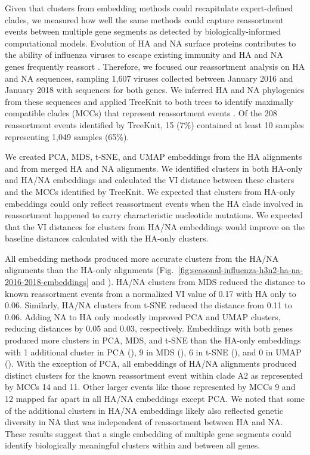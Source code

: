 \documentclass[10pt,letterpaper]{article}
\begin{document}
Given that clusters from embedding methods could recapitulate expert-defined clades, we measured how well the same methods could capture reassortment events between multiple gene segments as detected by biologically-informed computational models.
Evolution of HA and NA surface proteins contributes to the ability of influenza viruses to escape existing immunity \cite{Petrova2018} and HA and NA genes frequently reassort \cite{Nelson2008,Marshall2013,Potter2019}.
Therefore, we focused our reassortment analysis on HA and NA sequences, sampling 1,607 viruses collected between January 2016 and January 2018 with sequences for both genes.
We inferred HA and NA phylogenies from these sequences and applied TreeKnit to both trees to identify maximally compatible clades (MCCs) that represent reassortment events \cite{Barrat-Charlaix2022}.
Of the 208 reassortment events identified by TreeKnit, 15 (7\%) contained at least 10 samples representing 1,049 samples (65\%).

We created PCA, MDS, t-SNE, and UMAP embeddings from the HA alignments and from merged HA and NA alignments.
We identified clusters in both HA-only and HA/NA embeddings and calculated the VI distance between these clusters and the MCCs identified by TreeKnit.
We expected that clusters from HA-only embeddings could only reflect reassortment events when the HA clade involved in reassortment happened to carry characteristic nucleotide mutations.
We expected that the VI distances for clusters from HA/NA embeddings would improve on the baseline distances calculated with the HA-only clusters.

All embedding methods produced more accurate clusters from the HA/NA alignments than the HA-only alignments (Fig.~\ref{fig:seasonal-influenza-h3n2-ha-na-2016-2018-embeddings} and ).
HA/NA clusters from MDS reduced the distance to known reassortment events from a normalized VI value of 0.17 with HA only to 0.06.
Similarly, HA/NA clusters from t-SNE reduced the distance from 0.11 to 0.06.
Adding NA to HA only modestly improved PCA and UMAP clusters, reducing distances by 0.05 and 0.03, respectively.
Embeddings with both genes produced more clusters in PCA, MDS, and t-SNE than the HA-only embeddings with 1 additional cluster in PCA (), 9 in MDS (), 6 in t-SNE (), and 0 in UMAP ().
With the exception of PCA, all embeddings of HA/NA alignments produced distinct clusters for the known reassortment event within clade A2 \cite{Potter2019} as represented by MCCs 14 and 11.
Other larger events like those represented by MCCs 9 and 12 mapped far apart in all HA/NA embeddings except PCA.
We noted that some of the additional clusters in HA/NA embeddings likely also reflected genetic diversity in NA that was independent of reassortment between HA and NA.
These results suggest that a single embedding of multiple gene segments could identify biologically meaningful clusters within and between all genes.
\end{document}

